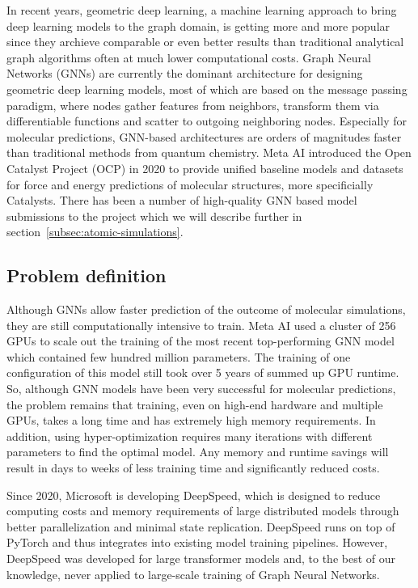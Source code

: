 In recent years, geometric deep learning, a machine learning approach to bring deep learning models 
to the graph domain, is getting more and more popular since they archieve comparable or even better 
results than traditional analytical graph algorithms often at much lower computational costs. Graph Neural 
Networks (GNNs) are currently the dominant architecture for designing geometric deep learning models, most of
which are based on the message passing paradigm, where nodes gather features from neighbors, transform them via 
differentiable functions and scatter to outgoing neighboring nodes. Especially for molecular predictions, 
GNN-based architectures are orders of magnitudes faster than traditional methods from quantum chemistry. 
Meta AI introduced the Open Catalyst Project (OCP) \cite*{Chanussot_2021} in 2020 to provide unified baseline models and datasets for 
force and energy predictions of molecular structures, more specificially Catalysts. There has been a number 
of high-quality GNN based model submissions 
\cite*{DBLP:journals/corr/abs-2003-03123, https://doi.org/10.48550/arxiv.2106.08903, https://doi.org/10.48550/arxiv.2203.09697} to the project which we will describe further in 
section~\ref*{subsec:atomic-simulations}.

\subsection{Problem definition}

Although GNNs allow faster prediction of the outcome of molecular simulations, they are still computationally intensive 
to train. Meta AI used a cluster of 256 GPUs to scale out the training of the most recent top-performing GNN model 
which contained few hundred million parameters. The training of one configuration of this model still took over 5 
years of summed up GPU runtime. So, although GNN models have been very successful for molecular predictions, 
the problem remains that training, even on high-end hardware and multiple GPUs, takes a long time and has extremely 
high memory requirements. In addition, using hyper-optimization requires many iterations with different parameters to 
find the optimal model. Any memory and runtime savings will result in days to weeks of less training time and significantly 
reduced costs.

Since 2020, Microsoft is developing DeepSpeed, which is designed to reduce computing costs and memory 
requirements of large distributed models through better parallelization and minimal state replication. DeepSpeed 
runs on top of PyTorch and thus integrates into existing model training pipelines. However, DeepSpeed was developed 
for large transformer models and, to the best of our knowledge, never applied to large-scale training of Graph Neural Networks.

